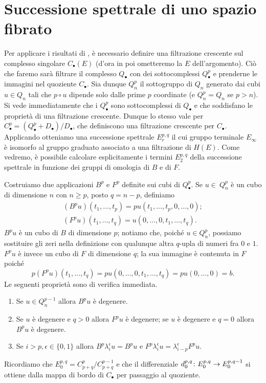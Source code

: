 \section{Successione spettrale di uno spazio fibrato}
Per applicare i risultati di \missing{}, è necessario definire una filtrazione crescente sul complesso singolare $C_\bullet(E)$ (d'ora in poi ometteremo la $E$ dell'argomento). Ciò che faremo sarà filtrare il complesso $Q_\bullet$ con dei sottocomplessi $Q^p_\bullet$ e prenderne le immagini nel quoziente $C_\bullet$. Sia dunque $Q^p_n$ il sottogruppo di $Q_n$ generato dai cubi $u\in Q_n$ tali che $p\circ u$ dipende solo dalle prime $p$ coordinate (e $Q^p_n=Q_n$ se $p>n$). Si vede immediatamente che i $Q^p_\bullet$ sono sottocomplessi di $Q_\bullet$ e che soddisfano le proprietà di una filtrazione crescente. Dunque lo stesso vale per $C^p_\bullet=(Q^p_\bullet+D_\bullet)/D_\bullet$, che definiscono una filtrazione crescente per $C_\bullet$. Applicando \missing{} otteniamo una successione spettrale $E^{p,q}_r$ il cui gruppo terminale $E_\infty$ è isomorfo al gruppo graduato associato a una filtrazione di $H(E)$. Come vedremo, è possibile calcolare esplicitamente i termini $E^{p,q}_2$ della successione spettrale in funzione dei gruppi di omologia di $B$ e di $F$.

Costruiamo due applicazioni $B^p$ e $F^p$ definite sui cubi di $Q^p_\bullet$. Se $u\in\ Q^p_n$ è un cubo di dimensione $n$ con $n\ge p$, posto $q=n-p$, definiamo
\begin{align*}
(B^pu)(t_1,\ldots,t_p)=pu(t_1,\ldots,t_p,0,\ldots,0);\\
(F^pu)(t_1,\ldots,t_q)=u(0,\ldots,0,t_1,\ldots,t_q).
\end{align*}
$B^pu$ è un cubo di $B$ di dimensione $p$; notiamo che, poiché $u\in Q^p_n$, possiamo sostituire gli zeri nella definizione con qualunque altra $q$-upla di numeri fra $0$ e $1$. $F^pu$ è invece un cubo di $F$ di dimensione $q$; la sua immagine è contenuta in $F$ poiché
$$
p(F^pu)(t_1,\ldots,t_q)=pu(0,\ldots,0,t_1,\ldots,t_q)=pu(0,\ldots,0)=b.
$$
Le seguenti proprietà sono di verifica immediata.
\begin{enumerate}
\item Se $u\in Q^{p-1}_n$ allora $B^pu$ è degenere.
\item Se $u$ è degenere e $q>0$ allora $F^pu$ è degenere; se $u$ è degenere e $q=0$ allora $B^pu$ è degenere.
\item Se $i>p,\epsilon\in\{0,1\}$ allora $B^p\lambda^\epsilon_iu=B^pu$ e $F^p\lambda^\epsilon_iu=\lambda^\epsilon_{i-p}F^pu$.
\end{enumerate}

Ricordiamo che $E^{p,q}_0=C^p_{p+q}/C^{p-1}_{p+q}$ e che il differenziale $d^{p,q}_0\colon E^{p,q}_0\to E^{p,q-1}_0$ si ottiene dalla mappa di bordo di $C_\bullet$ per passaggio al quoziente. 